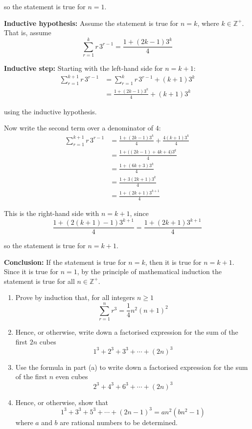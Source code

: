 \documentclass[leqno]{article}
\begin{document}
\begin{enumerate}[
  label=\textbf{\arabic*.},
  leftmargin=*,
  topsep=0pt,
  partopsep=0pt,
  parsep=0pt
]
\begin{djsSolution}
so the statement is true for $n=1$.

\textbf{Inductive hypothesis:} Assume the statement is true for $n=k$, where $k\in\mathbb{Z}^+$. That is, assume
\[
\sum_{r=1}^{k} r\,3^{r-1}=\frac{1+(2k-1)3^k}{4}
\]

\textbf{Inductive step:} Starting with the left-hand side for $n=k+1$:
\begin{align*}
\sum_{r=1}^{k+1} r\,3^{r-1}
&= \sum_{r=1}^{k} r\,3^{r-1} + (k+1)3^k \\
&= \frac{1+(2k-1)3^k}{4} + (k+1)3^k
\end{align*}

using the inductive hypothesis.

Now write the second term over a denominator of $4$:
\begin{align*}
\sum_{r=1}^{k+1} r\,3^{r-1}
&= \frac{1+(2k-1)3^k}{4} + \frac{4(k+1)3^k}{4} \\
&= \frac{1+\bigl((2k-1)+4k+4\bigr)3^k}{4} \\
&= \frac{1+(6k+3)3^k}{4} \\
&= \frac{1+3(2k+1)3^k}{4} \\
&= \frac{1+(2k+1)3^{k+1}}{4}
\end{align*}

This is the right-hand side with $n=k+1$, since
\[
\frac{1+(2(k+1)-1)3^{k+1}}{4}=\frac{1+(2k+1)3^{k+1}}{4}
\]

so the statement is true for $n=k+1$.

\textbf{Conclusion:} If the statement is true for $n=k$, then it is true for $n=k+1$. Since it is true for $n=1$, by the principle of mathematical induction the statement is true for all $n \in \mathbb{Z}^{+}$.
\end{djsSolution}


\newpage

\questionitem

\begin{enumerate}[label=\textbf{(\alph*)}]
  \item Prove by induction that, for all integers $n \ge 1$
  \[
  \sum_{r=1}^{n} r^3 = \frac{1}{4}n^2(n+1)^2
  \]
  \item Hence, or otherwise, write down a factorised expression for the sum of the first $2n$ cubes
  \[
  1^3 + 2^3 + 3^3 + \cdots + (2n)^3
  \]
  \item Use the formula in part (a) to write down a factorised expression for the sum of the first $n$ even cubes
  \[
  2^3 + 4^3 + 6^3 + \cdots + (2n)^3
  \]
  \item Hence, or otherwise, show that
  \[
  1^3 + 3^3 + 5^3 + \cdots + (2n-1)^3 = an^2(bn^2-1)
  \]
  where $a$ and $b$ are rational numbers to be determined.  \\
\end{enumerate}


\end{enumerate}
\end{document}
